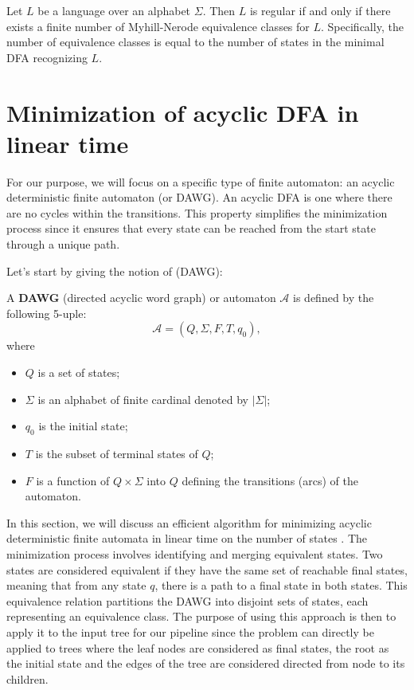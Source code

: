 \begin{theorem} \label{def:myhill-nerode}
    Let $L$ be a language over an alphabet $\Sigma$. Then $L$ is regular if and only if there exists a finite number of Myhill-Nerode equivalence classes for $L$. Specifically, the number of equivalence classes is equal to the number of states in the minimal DFA recognizing $L$.
\end{theorem}

\section{Minimization of acyclic DFA in linear time}
For our purpose, we will focus on a specific type of finite automaton: an acyclic deterministic finite automaton (or DAWG). An acyclic DFA is one where there are no cycles within the transitions. This property simplifies the minimization process since it ensures that every state can be reached from the start state through a unique path.

Let's start by giving the notion of  (DAWG):
\begin{definition}[DAWG]
    A \textbf{DAWG} (directed acyclic word graph) or automaton $\mathcal{A}$ is defined by the following 5-uple:
    \[
    \mathcal{A} = (Q, \Sigma, F, T, q_0),
    \]
    where
    \begin{itemize}
        \item $Q$ is a set of states;
        \item $\Sigma$ is an alphabet of finite cardinal denoted by $|\Sigma|$;
        \item $q_0$ is the initial state;
        \item $T$ is the subset of terminal states of $Q$;
        \item $F$ is a function of $Q \times \Sigma$ into $Q$ defining the transitions (arcs) of the automaton.
    \end{itemize}
\end{definition}

In this section, we will discuss an efficient algorithm for minimizing acyclic deterministic finite automata in linear time on the number of states \cite{revuz1992minimisation}. The minimization process involves identifying and merging equivalent states. Two states are considered equivalent if they have the same set of reachable final states, meaning that from any state $q$, there is a path to a final state in both states. This equivalence relation partitions the DAWG into disjoint sets of states, each representing an equivalence class. The purpose of using this approach is then to apply it to the input tree for our pipeline since the problem can directly be applied to trees where the leaf nodes are considered as final states, the root as the initial state and the edges of the tree are considered directed from node to its children. 

